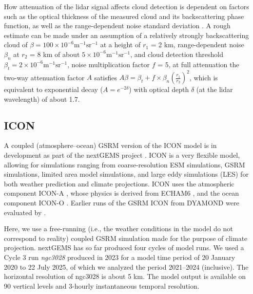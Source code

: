 \documentclass[draft]{agujournal2019}
\begin{document}
How attenuation of the lidar signal affects cloud detection is dependent on factors such as the optical thickness of the measured cloud and its backscattering phase function, as well as the range-dependent noise standard deviation \cite{kuma2021}. A rough estimate can be made under an assumption of a relatively strongly backscattering cloud of $\beta = \mathrm{100\times 10^{-6} m^{-1}sr^{-1}}$ at a height of $r_1$ = 2 km, range-dependent noise $\beta_n$ at $r_2$ = 8 km of about $\mathrm{5\times 10^{-6} m^{-1}sr^{-1}}$, and cloud detection threshold $\beta_t = \mathrm{2\times 10^{-6} m^{-1}sr^{-1}}$, noise multiplication factor $f$ = 5, at full attenuation the two-way attenuation factor $A$ satisfies $A\beta = \beta_t + f\times \beta_n\left(\frac{r_1}{r_2}\right)^2$, which is equivalent to exponential decay ($A = e^{-2\delta}$) with optical depth $\delta$ (at the lidar wavelength) of about 1.7.

\subsection{ICON}
\label{sec:icon}

A coupled (atmosphere--ocean) GSRM version of the ICON model is in development as part of the nextGEMS project \cite{hohenegger2023}. ICON is a very flexible model, allowing for simulations ranging from coarse-resolution ESM simulations, GSRM simulations, limited area model simulations, and large eddy simulations (LES) for both weather prediction and climate projections. ICON uses the atmospheric component ICON-A \cite{giorgetta2018}, whose physics is derived from ECHAM6 \cite{stevens2013}, and the ocean component ICON-O \cite{korn2022}. Earlier runs of the GSRM ICON from DYAMOND were evaluated by .

Here, we use a free-running (i.e., the weather conditions in the model do not correspond to reality) coupled GSRM simulation made for the purpose of climate projection. nextGEMS has so far produced four cycles of model runs. We used a Cycle 3 run \emph{ngc3028} produced in 2023 \cite{nextgems2023a,nextgems2023b} for a model time period of 20 January 2020 to 22 July 2025, of which we analyzed the period 2021--2024 (inclusive). The horizontal resolution of ngc3028 is about 5 km. The model output is available on 90 vertical levels and 3-hourly instantaneous temporal resolution.
\end{document}
